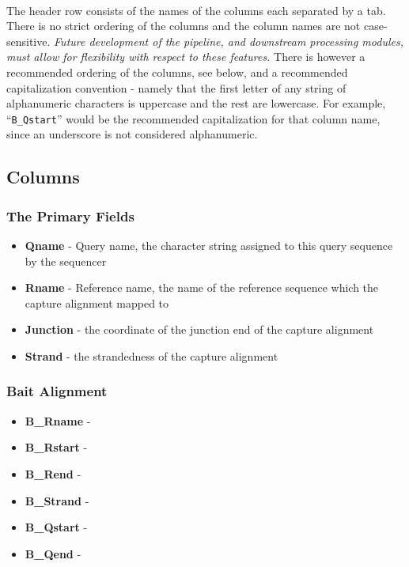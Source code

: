 \documentclass{article}
\begin{document}
\paragraph{} The header row consists of the names of the columns each separated by a tab. There is no strict ordering of the columns and the column names are not case-sensitive. \emph {Future development of the pipeline, and downstream processing modules, must allow for flexibility with respect to these features.} There is however a recommended ordering of the columns, see below, and a recommended capitalization convention - namely that the first letter of any string of alphanumeric characters is uppercase and the rest are lowercase. For example, ``\texttt{B\_Qstart}'' would be the recommended capitalization for that column name, since an underscore is not considered alphanumeric.


\subsection*{Columns}
\subsubsection*{The Primary Fields}
\begin{itemize}
  \item \textbf{Qname} - Query name, the character string assigned to this query sequence by the sequencer
  \item \textbf{Rname} - Reference name, the name of the reference sequence which the capture alignment mapped to
  \item \textbf{Junction} - the coordinate of the junction end of the capture alignment
  \item \textbf{Strand} - the strandedness of the capture alignment 
\end{itemize}

\subsubsection*{Bait Alignment}
\begin{itemize}
  \item \textbf{B\_Rname} - 
  \item \textbf{B\_Rstart} - 
  \item \textbf{B\_Rend} - 
  \item \textbf{B\_Strand} - 
  \item \textbf{B\_Qstart} - 
  \item \textbf{B\_Qend} - 
\end{itemize}
\end{document}
